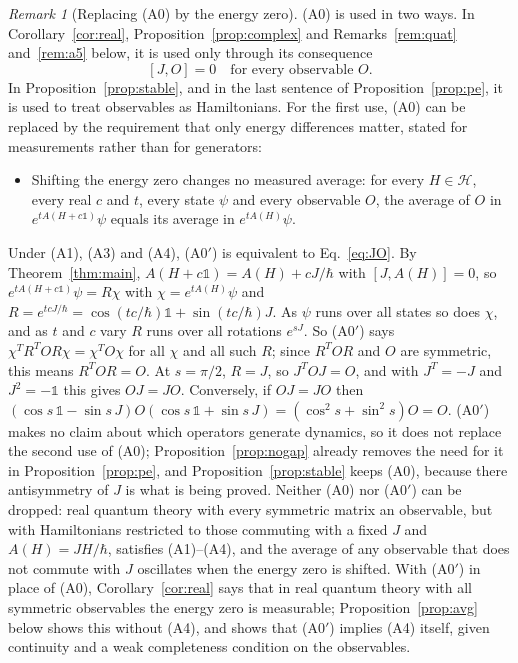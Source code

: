 \documentclass[11pt]{article}
\theoremstyle{remark}
\newtheorem{remark}[theorem]{Remark}
\newcommand{\one}{\mathbb{1}}
\begin{document}
\begin{remark}[Replacing (A0) by the energy zero]\label{rem:a0}
(A0) is used in two ways. In Corollary~\ref{cor:real}, Proposition~\ref{prop:complex} and Remarks~\ref{rem:quat} and~\ref{rem:a5} below, it is used only through its consequence
\begin{equation}\label{eq:JO}
[J,O]=0\quad\text{for every observable }O.
\end{equation}
In Proposition~\ref{prop:stable}, and in the last sentence of Proposition~\ref{prop:pe}, it is used to treat observables as Hamiltonians. For the first use, (A0) can be replaced by the requirement that only energy differences matter, stated for measurements rather than for generators:
\begin{itemize}
\item[(A0$'$)] Shifting the energy zero changes no measured average: for every $H\in\mathcal{H}$, every real $c$ and $t$, every state $\psi$ and every observable $O$, the average of $O$ in $e^{tA(H+c\one)}\psi$ equals its average in $e^{tA(H)}\psi$.
\end{itemize}
Under (A1), (A3) and (A4), (A0$'$) is equivalent to Eq.~\eqref{eq:JO}. By Theorem~\ref{thm:main}, $A(H+c\one)=A(H)+cJ/\hbar$ with $[J,A(H)]=0$, so $e^{tA(H+c\one)}\psi=R\chi$ with $\chi=e^{tA(H)}\psi$ and $R=e^{tcJ/\hbar}=\cos(tc/\hbar)\one+\sin(tc/\hbar)J$. As $\psi$ runs over all states so does $\chi$, and as $t$ and $c$ vary $R$ runs over all rotations $e^{sJ}$. So (A0$'$) says $\chi^TR^TOR\chi=\chi^TO\chi$ for all $\chi$ and all such $R$; since $R^TOR$ and $O$ are symmetric, this means $R^TOR=O$. At $s=\pi/2$, $R=J$, so $J^TOJ=O$, and with $J^T=-J$ and $J^2=-\one$ this gives $OJ=JO$. Conversely, if $OJ=JO$ then $(\cos s\,\one-\sin s\,J)O(\cos s\,\one+\sin s\,J)=(\cos^2s+\sin^2s)O=O$. (A0$'$) makes no claim about which operators generate dynamics, so it does not replace the second use of (A0); Proposition~\ref{prop:nogap} already removes the need for it in Proposition~\ref{prop:pe}, and Proposition~\ref{prop:stable} keeps (A0), because there antisymmetry of $J$ is what is being proved. Neither (A0) nor (A0$'$) can be dropped: real quantum theory with every symmetric matrix an observable, but with Hamiltonians restricted to those commuting with a fixed $J$ and $A(H)=JH/\hbar$, satisfies (A1)--(A4), and the average of any observable that does not commute with $J$ oscillates when the energy zero is shifted. With (A0$'$) in place of (A0), Corollary~\ref{cor:real} says that in real quantum theory with all symmetric observables the energy zero is measurable; Proposition~\ref{prop:avg} below shows this without (A4), and shows that (A0$'$) implies (A4) itself, given continuity and a weak completeness condition on the observables.
\end{remark}
\end{document}
